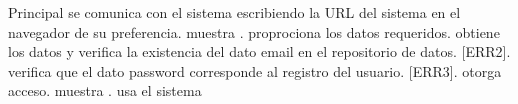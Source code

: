 \begin{UCtrayectoria}{Principal}
		\UCpaso[\UCactor] se comunica con el sistema escribiendo la URL del sistema en el navegador de su preferencia.
		\UCpaso muestra .
		\UCpaso[\UCactor] proprociona los datos requeridos.
		\UCpaso obtiene los datos y verifica la existencia del dato email en el repositorio de datos. [ERR2].
		\UCpaso verifica que el dato password corresponde al registro del usuario. [ERR3].
		\UCpaso otorga acceso.
		\UCpaso muestra .
		\UCpaso[\UCactor] usa el sistema
\end{UCtrayectoria}
